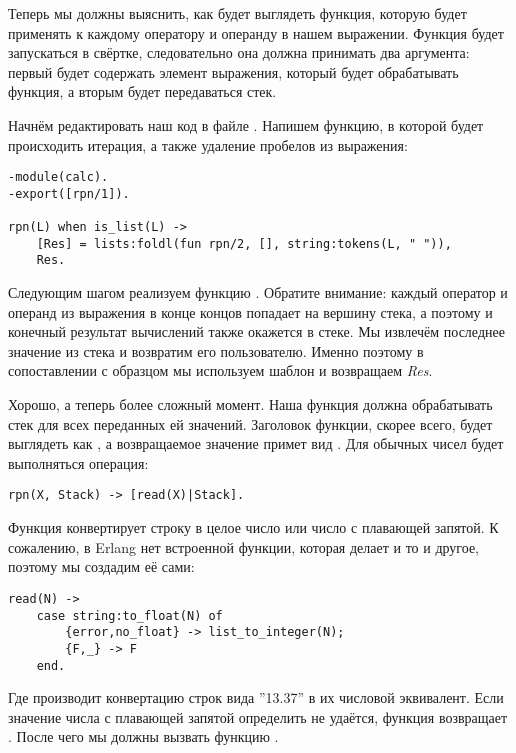 Теперь мы должны выяснить, как будет выглядеть функция, которую  будет применять к каждому оператору и операнду в нашем выражении.
Функция будет запускаться в свёртке, следовательно она должна принимать два аргумента: первый будет содержать элемент выражения, который будет обрабатывать функция, а вторым будет передаваться стек.

Начнём редактировать наш код в файле .
Напишем функцию, в которой будет происходить итерация, а также удаление пробелов из выражения:
\begin{lstlisting}[style=erlang]
-module(calc).
-export([rpn/1]).
 
rpn(L) when is_list(L) ->
    [Res] = lists:foldl(fun rpn/2, [], string:tokens(L, " ")),
    Res.
\end{lstlisting}

Следующим шагом реализуем функцию .
Обратите внимание: каждый оператор и операнд из выражения в конце концов попадает на вершину стека, а поэтому и конечный результат вычислений также окажется в стеке.
Мы извлечём последнее значение из стека и возвратим его пользователю.
Именно поэтому в сопоставлении с образцом мы используем шаблон \ops{[Res]} и возвращаем \emph{Res}.

Хорошо, а теперь более сложный момент.
Наша функция  должна обрабатывать стек для всех переданных ей значений.
Заголовок функции, скорее всего, будет выглядеть как , а возвращаемое значение примет вид .
Для обычных чисел будет выполняться операция:
\begin{lstlisting}[style=erlang]
rpn(X, Stack) -> [read(X)|Stack].
\end{lstlisting}

Функция  конвертирует строку в целое число или число с плавающей запятой.
К сожалению, в Erlang нет встроенной функции, которая делает и то и другое, поэтому мы создадим её сами:
\begin{lstlisting}[style=erlang]
read(N) ->
    case string:to_float(N) of
        {error,no_float} -> list_to_integer(N);
        {F,_} -> F
    end.
\end{lstlisting}

Где  производит конвертацию строк вида ''13.37'' в их числовой эквивалент.
Если значение числа с плавающей запятой определить не удаётся, функция возвращает .
После чего мы должны вызвать функцию .

